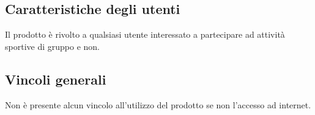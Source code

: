 \subsection{Caratteristiche degli utenti}

Il prodotto è rivolto a qualsiasi utente interessato a partecipare ad attività sportive di gruppo e non.

\subsection{Vincoli generali}

Non è presente alcun vincolo all'utilizzo del prodotto se non l'accesso ad internet.
